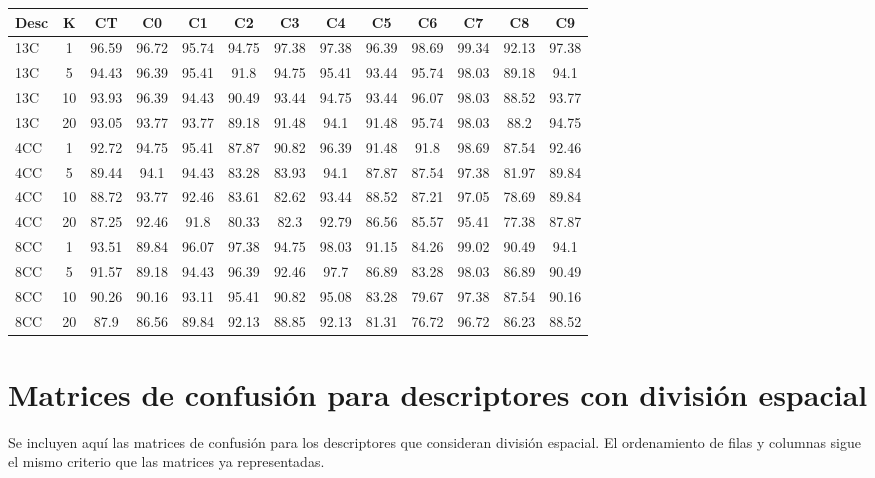 \begin{appendices}
\begin{tabular}{|l|c|c|c|c|c|c|c|c|c|c|c|c|}
\hline
\textbf{Desc}&\textbf{K}&\textbf{CT}&\textbf{C0}&\textbf{C1}&\textbf{C2}&\textbf{C3}&\textbf{C4}&\textbf{C5}&\textbf{C6}&\textbf{C7}&\textbf{C8}&\textbf{C9}\\
\hline
13C&1&96.59&96.72&95.74&94.75&97.38&97.38&96.39&98.69&99.34&92.13&97.38\\
\hline
13C&5&94.43&96.39&95.41&91.8&94.75&95.41&93.44&95.74&98.03&89.18&94.1\\
\hline
13C&10&93.93&96.39&94.43&90.49&93.44&94.75&93.44&96.07&98.03&88.52&93.77\\
\hline
13C&20&93.05&93.77&93.77&89.18&91.48&94.1&91.48&95.74&98.03&88.2&94.75\\
\hline
4CC&1&92.72&94.75&95.41&87.87&90.82&96.39&91.48&91.8&98.69&87.54&92.46\\
\hline
4CC&5&89.44&94.1&94.43&83.28&83.93&94.1&87.87&87.54&97.38&81.97&89.84\\
\hline
4CC&10&88.72&93.77&92.46&83.61&82.62&93.44&88.52&87.21&97.05&78.69&89.84\\
\hline
4CC&20&87.25&92.46&91.8&80.33&82.3&92.79&86.56&85.57&95.41&77.38&87.87\\
\hline
8CC&1&93.51&89.84&96.07&97.38&94.75&98.03&91.15&84.26&99.02&90.49&94.1\\
\hline
8CC&5&91.57&89.18&94.43&96.39&92.46&97.7&86.89&83.28&98.03&86.89&90.49\\
\hline
8CC&10&90.26&90.16&93.11&95.41&90.82&95.08&83.28&79.67&97.38&87.54&90.16\\
\hline
8CC&20&87.9&86.56&89.84&92.13&88.85&92.13&81.31&76.72&96.72&86.23&88.52\\
\hline\end{tabular}

\section{Matrices de confusión para descriptores con división espacial}

Se incluyen aquí las matrices de confusión para los descriptores que consideran
división espacial. El ordenamiento de filas y columnas sigue el mismo criterio
que las matrices ya representadas.


\end{appendices}
